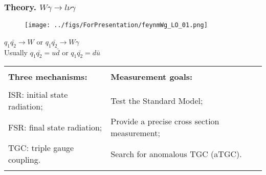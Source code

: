 \begin{frame}\frametitle{Theory. $W\gamma\rightarrow l\nu\gamma$}
   \begin{figure}[htb]
      \begin{center}
        \scriptsize
          \texttt{[image: ../figs/ForPresentation/feynmWg\_LO\_01.png]}
       \end{center}
    \end{figure}
\scriptsize
$q_1\bar{q_2}\rightarrow W$ or $q_1\bar{q_2}\rightarrow W\gamma$\\
Usually $q_1\bar{q_2}=u\bar{d}$ or  $q_1\bar{q_2}=d\bar{u}$\\

\begin{table}[h]
  \scriptsize
  \begin{center}
   \begin{tabular}{|l|l|}
    \hline
         &  \\ 
     {\bfseries{Three mechanisms:}}  & {\bfseries{Measurement goals:}}  \\
         &  \\ 
     ISR: initial state radiation;   & Test the Standard Model;  \\ 
     FSR: final state radiation;    &  Provide a precise cross section measurement; \\ 
     TGC: triple gauge coupling.    &  Search for anomalous TGC (aTGC).\\ 
    &  \\  \hline
  \end{tabular}
  \end{center}
\end{table}

\end{frame}%

